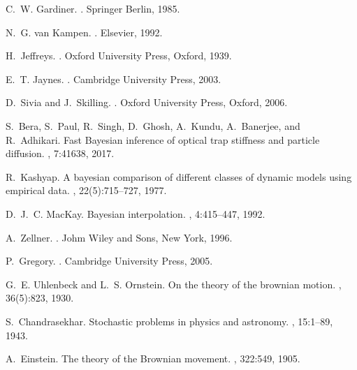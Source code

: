 \documentclass[english,aps, twocolumn, pre,superscriptaddress, notitlepage]{revtex4-1}
\begin{document}
\begin{thebibliography}{10}

C.~W. Gardiner.
.
\newblock Springer Berlin, 1985.

N.~G. van Kampen.
.
\newblock Elsevier, 1992.

H.~Jeffreys.
.
\newblock Oxford University Press, Oxford, 1939.

E.~T. Jaynes.
.
\newblock Cambridge University Press, 2003.

D.~Sivia and J.~Skilling.
.
\newblock Oxford University Press, Oxford, 2006.

S.~Bera, S.~Paul, R.~Singh, D.~Ghosh, A.~Kundu, A.~Banerjee, and R.~Adhikari.
\newblock Fast {B}ayesian inference of optical trap stiffness and particle
  diffusion.
, 7:41638, 2017.

R.~Kashyap.
\newblock A bayesian comparison of different classes of dynamic models using
  empirical data.
, 22(5):715--727, 1977.

D.~J.~C. MacKay.
\newblock Bayesian interpolation.
, 4:415--447, 1992.

A.~Zellner.
.
\newblock Johm Wiley and Sons, New York, 1996.

P.~Gregory.
.
\newblock Cambridge University Press, 2005.

G.~E. Uhlenbeck and L.~S. Ornstein.
\newblock On the theory of the brownian motion.
, 36(5):823, 1930.

S.~Chandrasekhar.
\newblock Stochastic problems in physics and astronomy.
, 15:1--89, 1943.

A.~Einstein.
\newblock The theory of the {B}rownian movement.
, 322:549, 1905.


\end{thebibliography}
\end{document}
